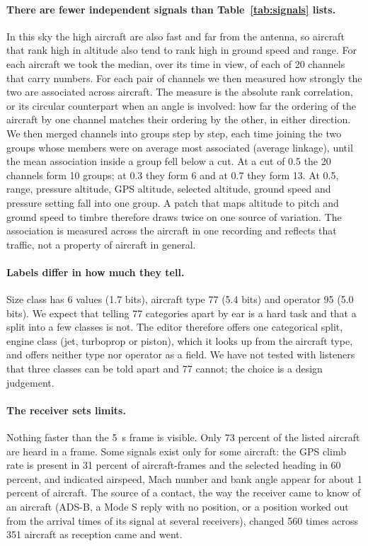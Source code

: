 \documentclass[11pt,letterpaper]{article}
\begin{document}
\paragraph{There are fewer independent signals than Table~\ref{tab:signals} lists.} In this sky the high aircraft are also fast and far from the antenna, so aircraft that rank high in altitude also tend to rank high in ground speed and range. For each aircraft we took the median, over its time in view, of each of 20 channels that carry numbers. For each pair of channels we then measured how strongly the two are associated across aircraft. The measure is the absolute rank correlation, or its circular counterpart when an angle is involved: how far the ordering of the aircraft by one channel matches their ordering by the other, in either direction. We then merged channels into groups step by step, each time joining the two groups whose members were on average most associated (average linkage), until the mean association inside a group fell below a cut. At a cut of 0.5 the 20 channels form 10 groups; at 0.3 they form 6 and at 0.7 they form 13. At 0.5, range, pressure altitude, GPS altitude, selected altitude, ground speed and pressure setting fall into one group. A patch that maps altitude to pitch and ground speed to timbre therefore draws twice on one source of variation. The association is measured across the aircraft in one recording and reflects that traffic, not a property of aircraft in general.

\paragraph{Labels differ in how much they tell.} Size class has 6 values (1.7 bits), aircraft type 77 (5.4 bits) and operator 95 (5.0 bits). We expect that telling 77 categories apart by ear is a hard task and that a split into a few classes is not. The editor therefore offers one categorical split, engine class (jet, turboprop or piston), which it looks up from the aircraft type, and offers neither type nor operator as a field. We have not tested with listeners that three classes can be told apart and 77 cannot; the choice is a design judgement.

\paragraph{The receiver sets limits.} Nothing faster than the 5~s frame is visible. Only 73 percent of the listed aircraft are heard in a frame. Some signals exist only for some aircraft: the GPS climb rate is present in 31 percent of aircraft-frames and the selected heading in 60 percent, and indicated airspeed, Mach number and bank angle appear for about 1 percent of aircraft. The source of a contact, the way the receiver came to know of an aircraft (ADS-B, a Mode S reply with no position, or a position worked out from the arrival times of its signal at several receivers), changed 560 times across 351 aircraft as reception came and went.
\end{document}
